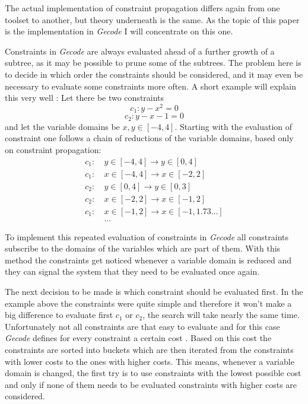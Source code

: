 \documentclass[10pt,
               a4paper,
               journal,
               ]{IEEEtran}
\begin{document}
	The actual implementation of constraint propagation differs again from one toolset to another, but theory underneath is the same. As the topic of this paper is the implementation in \emph{Gecode} I will concentrate on this one.
	
	Constraints in \emph{Gecode} are always evaluated ahead of a further growth of a subtree, as it may be possible to prune some of the subtrees. The problem here is to decide in which order the constraints should be considered, and it may even be necessary to evaluate some constraints more often. A short example will explain this very well \cite[p.~575]{handbookCP}: Let there be two constraints 
	\begin{equation}
		c_1: y - x^2 = 0
	\end{equation}
	\begin{equation}
		c_2: y - x - 1 = 0
	\end{equation}
	and let the variable domains be $x, y \in [-4, 4]$. Starting with the evaluation of constraint one follows a chain of reductions of the variable domains, based only on constraint propagation:
	\begin{equation}
	\begin{split}
		c_1:\ &y \in [-4, 4] \rightarrow y \in [0, 4] \\
		c_1:\ &x \in [-4, 4] \rightarrow x \in [-2, 2] \\
		c_2:\ &y \in [0, 4] \rightarrow y \in [0, 3] \\
		c_2:\ &x \in [-2, 2] \rightarrow x \in [-1, 2] \\
		c_1:\ &x \in [-1, 2] \rightarrow x \in [-1, 1.73 \dots] \\
		&\dots
	\end{split}
	\end{equation}
	
	To implement this repeated evaluation of constraints in \emph{Gecode} all constraints subscribe to the domains of the variables which are part of them. With this method the constraints get noticed whenever a variable domain is reduced and they can signal the system that they need to be evaluated once again.
	
	The next decision to be made is which constraint should be evaluated first. In the example above the constraints were quite simple and therefore it won't make a big difference to evaluate first $c_1$ or $c_2$, the search will take nearly the same time. Unfortunately not all constraints are that easy to evaluate and for this case \emph{Gecode} defines for every constraint a certain cost \cite[p.~275]{programmingGecode}. Based on this cost the constraints are sorted into buckets which are then iterated from the constraints with lower costs to the ones with higher costs. This means, whenever a variable domain is changed, the first try is to use constraints with the lowest possible cost and only if none of them needs to be evaluated constraints with higher costs are considered.
	
\end{document}
